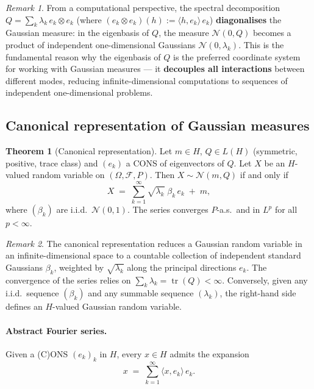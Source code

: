 \documentclass[11pt]{article}
\theoremstyle{definition}
\newtheorem{theorem}{Theorem}
\theoremstyle{remark}
\newtheorem{remark}{Remark}
\DeclareMathOperator{\tr}{tr}
\begin{document}
\begin{remark}
From a computational perspective, the spectral decomposition $Q = \sum_k \lambda_k\,e_k \otimes e_k$ (where $(e_k \otimes e_k)(h) := \langle h, e_k\rangle\,e_k$) \textbf{diagonalises} the Gaussian measure: in the eigenbasis of $Q$, the measure $\mathcal{N}(0, Q)$ becomes a product of independent one-dimensional Gaussians $\mathcal{N}(0, \lambda_k)$.  This is the fundamental reason why the eigenbasis of $Q$ is the preferred coordinate system for working with Gaussian measures --- it \textbf{decouples all interactions} between different modes, reducing infinite-dimensional computations to sequences of independent one-dimensional problems.
\end{remark}

\subsection*{Canonical representation of Gaussian measures}

\begin{theorem}[Canonical representation]
Let $m \in H$, $Q \in L(H)$ (symmetric, positive, trace class) and $(e_k)$ a CONS
of eigenvectors of $Q$.
Let $X$ be an $H$-valued random variable on $(\Omega, \mathcal{F}, P)$.
Then $X \sim \mathcal{N}(m, Q)$ if and only if
\[
    X \;=\; \sum_{k=1}^{\infty} \sqrt{\lambda_k}\;\beta_k\,e_k \;+\; m,
\]
where $(\beta_k)$ are i.i.d.\ $\mathcal{N}(0,1)$.
The series converges $P$-a.s.\ and in $L^p$ for all $p < \infty$.
\end{theorem}

\begin{remark}
The canonical representation reduces a Gaussian random variable in an infinite-dimensional space to a countable collection of independent standard Gaussians $\beta_k$, weighted by $\sqrt{\lambda_k}$ along the principal directions $e_k$.  The convergence of the series relies on $\sum_k \lambda_k = \tr(Q) < \infty$.  Conversely, given any i.i.d.\ sequence $(\beta_k)$ and any summable sequence $(\lambda_k)$, the right-hand side defines an $H$-valued Gaussian random variable.
\end{remark}

\paragraph{Abstract Fourier series.}
Given a (C)ONS $(e_k)_k$ in $H$, every $x \in H$ admits the expansion
\[
    x \;=\; \sum_{k=1}^{\infty} \langle x, e_k \rangle\, e_k.
\]
\end{document}
